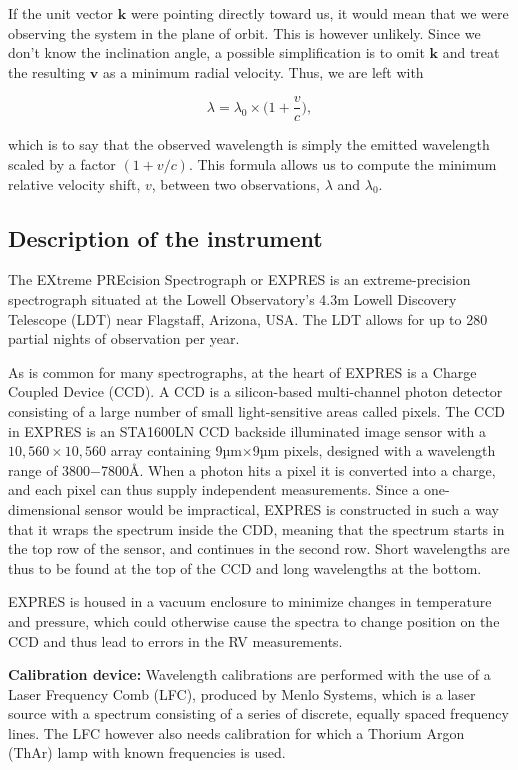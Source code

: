 If the unit vector $\textbf{k}$ were pointing directly toward us, it would mean that we were observing the system in the plane of orbit. This is however unlikely. Since we don't know the inclination angle, a possible simplification is to omit $\textbf{k}$ and treat the resulting $\textbf{v}$ as a minimum radial velocity. Thus, we are left with 

\begin{equation}
    \label{eq:our_doppler}
    \lambda = \lambda_0 \times \Big(1 + \frac{v}{c} \Big),
\end{equation}

which is to say that the observed wavelength is simply the emitted wavelength scaled by a factor $(1 + v/c)$. This formula allows us to compute the minimum relative velocity shift, $v$, between two observations, $\lambda$ and $\lambda_0$.


\subsection{Description of the instrument}
The EXtreme PREcision Spectrograph or EXPRES is an extreme-precision spectrograph situated at the Lowell Observatory's 4.3m Lowell Discovery Telescope (LDT) near Flagstaff, Arizona, USA. The LDT allows for up to 280 partial nights of observation per year.

As is common for many spectrographs, at the heart of EXPRES is a Charge Coupled Device (CCD). A CCD is a silicon-based multi-channel photon detector consisting of a large number of small light-sensitive areas called pixels. The CCD in EXPRES is an STA1600LN CCD backside illuminated image sensor with a $10,560 \times 10,560$ array containing 9µm$\times$9µm pixels, designed with a wavelength range of 3800$-$7800Å. When a photon hits a pixel it is converted into a charge, and each pixel can thus supply independent measurements. Since a one-dimensional sensor would be impractical, EXPRES is constructed in such a way that it wraps the spectrum inside the CDD, meaning that the spectrum starts in the top row of the sensor, and continues in the second row. Short wavelengths are thus to be found at the top of the CCD and long wavelengths at the bottom.

EXPRES is housed in a vacuum enclosure to minimize changes in temperature and pressure, which could otherwise cause the spectra to change position on the CCD and thus lead to errors in the RV measurements. 

\bigbreak
\noindent\textbf{Calibration device:}
Wavelength calibrations are performed with the use of a Laser Frequency Comb 
(LFC), produced by Menlo Systems, which is a laser source with a spectrum consisting of a series of discrete, equally spaced frequency lines. The LFC however also needs calibration for which a Thorium Argon (ThAr) lamp with known frequencies is used.


